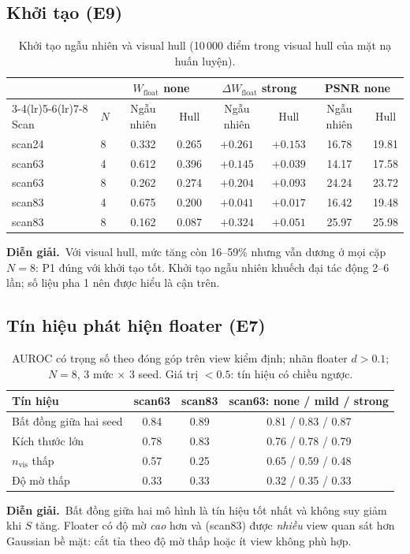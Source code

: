 \documentclass[11pt,a4paper]{article}
\newcommand{\W}{W_{\text{float}}}
\newcommand{\dW}{\Delta W_{\text{float}}}
\newcommand{\interp}{\par\smallskip\noindent\textbf{Diễn giải.}~}
\begin{document}
\subsection{Khởi tạo (E9)}
\label{sec:init}
\begin{table}[H]
\centering\small
\caption{Khởi tạo ngẫu nhiên và visual hull (10\,000 điểm trong visual hull của mặt nạ huấn luyện).}
\begin{tabular}{@{}llcccccc@{}}
\toprule
& & \multicolumn{2}{c}{$\W$ none} & \multicolumn{2}{c}{$\dW$ strong} & \multicolumn{2}{c}{PSNR none} \\
\cmidrule(lr){3-4}\cmidrule(lr){5-6}\cmidrule(lr){7-8}
Scan & $N$ & Ngẫu nhiên & Hull & Ngẫu nhiên & Hull & Ngẫu nhiên & Hull \\
\midrule
scan24 & 8 & 0.332 & 0.265 & $+0.261$ & $+0.153$ & 16.78 & 19.81 \\
scan63 & 4 & 0.612 & 0.396 & $+0.145$ & $+0.039$ & 14.17 & 17.58 \\
scan63 & 8 & 0.262 & 0.274 & $+0.204$ & $+0.093$ & 24.24 & 23.72 \\
scan83 & 4 & 0.675 & 0.200 & $+0.041$ & $+0.017$ & 16.42 & 19.48 \\
scan83 & 8 & 0.162 & 0.087 & $+0.324$ & $+0.051$ & 25.97 & 25.98 \\
\bottomrule
\end{tabular}
\end{table}
\interp Với visual hull, mức tăng còn 16--59\% nhưng vẫn dương ở mọi cặp $N=8$: P1 đúng với khởi tạo tốt. Khởi tạo ngẫu nhiên khuếch đại tác động 2--6 lần; số liệu pha 1 nên được hiểu là cận trên.

\subsection{Tín hiệu phát hiện floater (E7)}
\label{sec:e7}
\begin{table}[H]
\centering\small
\caption{AUROC có trọng số theo đóng góp trên view kiểm định; nhãn floater $d>0.1$; $N=8$, 3 mức $\times$ 3 seed. Giá trị $<0.5$: tín hiệu có chiều ngược.}
\begin{tabular}{@{}lccc@{}}
\toprule
Tín hiệu & scan63 & scan83 & scan63: none / mild / strong \\
\midrule
Bất đồng giữa hai seed & 0.84 & 0.89 & 0.81 / 0.83 / 0.87 \\
Kích thước lớn & 0.78 & 0.83 & 0.76 / 0.78 / 0.79 \\
$n_{\text{vis}}$ thấp & 0.57 & 0.25 & 0.65 / 0.59 / 0.48 \\
Độ mờ thấp & 0.33 & 0.33 & 0.32 / 0.35 / 0.33 \\
\bottomrule
\end{tabular}
\end{table}
\interp Bất đồng giữa hai mô hình là tín hiệu tốt nhất và không suy giảm khi $S$ tăng. Floater có độ mờ \emph{cao} hơn và (scan83) được \emph{nhiều} view quan sát hơn Gaussian bề mặt: cắt tỉa theo độ mờ thấp hoặc ít view không phù hợp.
\end{document}
